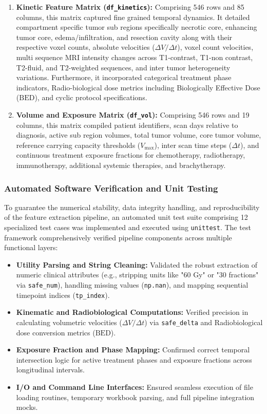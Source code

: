 \begin{enumerate}
    \item \textbf{Kinetic Feature Matrix (\texttt{df\_kinetics}):} Comprising 546 rows and 85 columns, this matrix captured fine grained temporal dynamics. It detailed compartment specific tumor sub regions specifically necrotic core, enhancing tumor core, edema/infiltration, and resection cavity along with their respective voxel counts, absolute velocities ($\Delta V / \Delta t$), voxel count velocities, multi sequence MRI intensity changes across T1-contrast, T1-non contrast, T2-fluid, and T2-weighted sequences, and inter tumor heterogeneity variations. Furthermore, it incorporated categorical treatment phase indicators, Radio-biological dose metrics including Biologically Effective Dose ($\text{BED}$), and cyclic protocol specifications.
    \item \textbf{Volume and Exposure Matrix (\texttt{df\_vol}):} Comprising 546 rows and 19 columns, this matrix compiled patient identifiers, scan days relative to diagnosis, active sub region volumes, total tumor volume, core tumor volume, reference carrying capacity thresholds ($V_{\max}$), inter scan time steps ($\Delta t$), and continuous treatment exposure fractions for chemotherapy, radiotherapy, immunotherapy, additional systemic therapies, and brachytherapy.
\end{enumerate}

\subsubsection{Automated Software Verification and Unit Testing}

To guarantee the numerical stability, data integrity handling, and reproducibility of the feature extraction pipeline, an automated unit test suite comprising 12 specialized test cases was implemented and executed using \texttt{unittest}. The test framework comprehensively verified pipeline components across multiple functional layers:

\begin{itemize}
    \item \textbf{Utility Parsing and String Cleaning:} Validated the robust extraction of numeric clinical attributes (e.g., stripping units like "60 Gy" or "30 fractions" via \texttt{safe\_num}), handling missing values (\texttt{np.nan}), and mapping sequential timepoint indices (\texttt{tp\_index}).
    \item \textbf{Kinematic and Radiobiological Computations:} Verified precision in calculating volumetric velocities ($\Delta V / \Delta t$) via \texttt{safe\_delta} and Radiobiological dose conversion metrics ($\text{BED}$).
    \item \textbf{Exposure Fraction and Phase Mapping:} Confirmed correct temporal intersection logic for active treatment phases and exposure fractions across longitudinal intervals.
    \item \textbf{I/O and Command Line Interfaces:} Ensured seamless execution of file loading routines, temporary workbook parsing, and full pipeline integration mocks.
\end{itemize}

